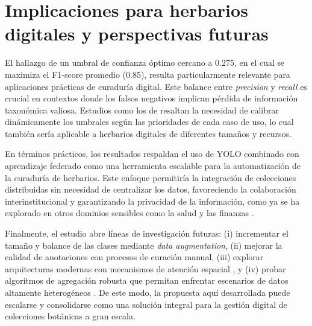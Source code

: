\section{Implicaciones para herbarios digitales y perspectivas futuras}

El hallazgo de un umbral de confianza óptimo cercano a 0.275, en el cual se maximiza el F1-score promedio (0.85), resulta particularmente relevante para aplicaciones prácticas de curaduría digital. Este balance entre \textit{precision} y \textit{recall} es crucial en contextos donde los falsos negativos implican pérdida de información taxonómica valiosa. Estudios como los de \cite{chen2020fedbe} resaltan la necesidad de calibrar dinámicamente los umbrales según las prioridades de cada caso de uso, lo cual también sería aplicable a herbarios digitales de diferentes tamaños y recursos.

En términos prácticos, los resultados respaldan el uso de YOLO combinado con aprendizaje federado como una herramienta escalable para la automatización de la curaduría de herbarios. Este enfoque permitiría la integración de colecciones distribuidas sin necesidad de centralizar los datos, favoreciendo la colaboración interinstitucional y garantizando la privacidad de la información, como ya se ha explorado en otros dominios sensibles como la salud y las finanzas \cite{bonawitz2016practicalsecureaggregationfederated,McMahan2017}. 

Finalmente, el estudio abre líneas de investigación futuras: (i) incrementar el tamaño y balance de las clases mediante \textit{data augmentation}, (ii) mejorar la calidad de anotaciones con procesos de curación manual, (iii) explorar arquitecturas modernas con mecanismos de atención espacial \citep{He2016}, y (iv) probar algoritmos de agregación robusta que permitan enfrentar escenarios de datos altamente heterogéneos \citep{mansour2022federated,pillutla2019robust}. De este modo, la propuesta aquí desarrollada puede escalarse y consolidarse como una solución integral para la gestión digital de colecciones botánicas a gran escala.